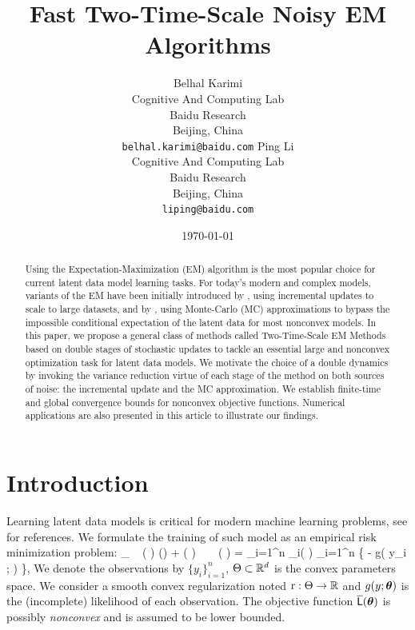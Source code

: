 \documentclass[11pt]{article}
\theoremstyle{t}
\begin{document}
\title{Fast Two-Time-Scale Noisy EM Algorithms}
\author{
  Belhal Karimi \\
  Cognitive And Computing Lab\\
  Baidu Research\\
  Beijing, China \\
  \texttt{belhal.karimi@baidu.com} 
   \And
  Ping Li \\
  Cognitive And Computing Lab\\
  Baidu Research\\
  Beijing, China \\
  \texttt{liping@baidu.com} }
\date{\today}

\maketitle

\begin{abstract}
Using the Expectation-Maximization (EM) algorithm is the most popular choice for current latent data model learning tasks. 
For today's modern and complex models, variants of the EM have been initially introduced by \citep{neal1998view}, using incremental updates to scale to large datasets, and by \citep{wei1990monte, delyon1999}, using Monte-Carlo (MC) approximations to bypass the impossible conditional expectation of the latent data for most nonconvex models.
In this paper, we propose a general class of methods called Two-Time-Scale EM Methods based on double stages of stochastic updates to tackle an essential large and nonconvex optimization task for latent data models.
We motivate the choice of a double dynamics by invoking the variance reduction virtue of each stage of the method on both sources of noise: the incremental update and the MC approximation.
We establish finite-time and global convergence bounds for nonconvex objective functions.
Numerical applications are also presented in this article to illustrate our findings.
\end{abstract}


\section{Introduction}
Learning latent data models is critical for modern machine learning problems, see \citep{mclachlan2007algorithm} for references.
We formulate the training of such model as an empirical risk minimization problem:
\beq \label{eq:em_motivate}
\min_{ \param \in \Param }~ \overline{\calL} ( \param ) \eqdef \Pen (\param) + \calL ( \param )~~~~\calL ( \param ) =  \sum_{i=1}^n \calL_i( \param) \eqdef  {} \sum_{i=1}^n \big\{ - \log g( y_i ; \param ) \big\}\eqs,
\eeq
We denote the observations by $\{y_i\}_{i=1}^n$, $\Theta \subset \mathbb{R}^d$ is the convex parameters space.
We consider a smooth convex regularization noted $\operatorname{r} : \Theta \rightarrow \mathbb{R}$ and $g(y;{\bm{\theta}})$ is the (incomplete) likelihood of each observation.
The objective function $ \overline{{\textsf{L}}} ( {\bm{\theta}} )$ is possibly \emph{nonconvex} and is assumed to be lower bounded.
\end{document}
